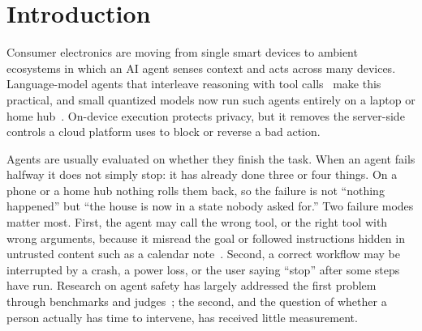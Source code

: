 \documentclass[conference]{IEEEtran}
\begin{document}
\section{Introduction}
Consumer electronics are moving from single smart devices to ambient ecosystems in which an AI agent senses context and acts across many devices. Language-model agents that interleave reasoning with tool calls~\cite{react,toolformer} make this practical, and small quantized models now run such agents entirely on a laptop or home hub~\cite{qwen25,edgequant}. On-device execution protects privacy, but it removes the server-side controls a cloud platform uses to block or reverse a bad action.

Agents are usually evaluated on whether they finish the task. When an agent fails halfway it does not simply stop: it has already done three or four things. On a phone or a home hub nothing rolls them back, so the failure is not ``nothing happened'' but ``the house is now in a state nobody asked for.'' Two failure modes matter most. First, the agent may call the wrong tool, or the right tool with wrong arguments, because it misread the goal or followed instructions hidden in untrusted content such as a calendar note~\cite{greshake}. Second, a correct workflow may be interrupted by a crash, a power loss, or the user saying ``stop'' after some steps have run. Research on agent safety has largely addressed the first problem through benchmarks and judges~\cite{toolemu,rjudge,agentdojo,agentharm,agentsafetybench}; the second, and the question of whether a person actually has time to intervene, has received little measurement.
\end{document}
